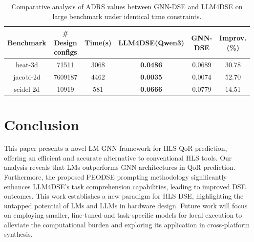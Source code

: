 \documentclass[conference]{IEEEtran}
\begin{document}
	\begin{table}[t]
		\centering
		\renewcommand{\arraystretch}{1.2}
		\setlength{\tabcolsep}{1pt}
            \scriptsize
		\caption{Comparative analysis of ADRS values between GNN-DSE and LLM4DSE on large benchmark under identical time constraints.}
		\begin{tabular}{c | c | c | c | c | c }
			\toprule
			\bf{Benchmark}& \bf{\# Design configs}&\bf{Time(s)}&\bf{LLM4DSE(Qwen3)}&\bf{GNN-DSE\cite{Sohrabizadeh2022}}&\bf{Improv.(\%)}\\
			\midrule
			heat-3d&71511&3068&\bf0.0486&0.0689&30.78\\
			jacobi-2d&7609187&4462&\bf0.0035&0.0074&52.70\\
			seidel-2d&10919&581&\bf0.0666&0.0779&14.51\\
			\bottomrule
		\end{tabular}
		\label{CA}
		\vspace{-5mm}
	\end{table}

	
\section{Conclusion}
	This paper presents a novel LM-GNN framework for HLS QoR prediction, offering an efficient and accurate alternative to conventional HLS tools. Our analysis reveals that LMs outperforms GNN architectures in QoR prediction. Furthermore, the proposed PEODSE prompting methodology significantly enhances LLM4DSE's task comprehension capabilities, leading to improved DSE outcomes. This work establishes a new paradigm for HLS DSE, highlighting the untapped potential of LMs and LLMs in hardware design. Future work will focus on employing smaller, fine-tuned and task-specific models for local execution to alleviate the computational burden and exploring its application in cross-platform synthesis.
	


\end{document}
